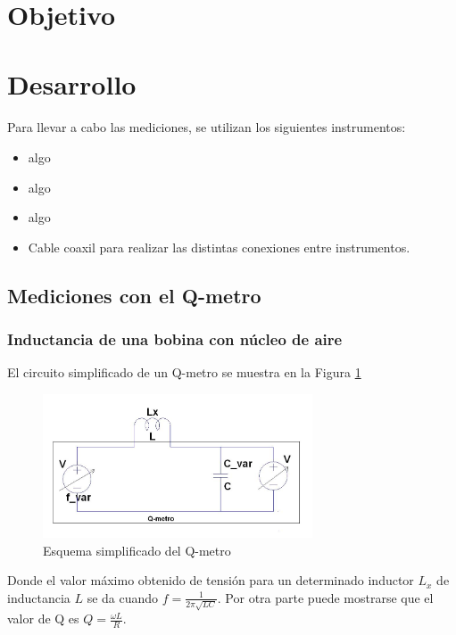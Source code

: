 \documentclass[a4paper,10pt]{article}
\title{  }
\begin{document}
	\maketitle %
	\newpage

	\tableofcontents %
	\newpage


	\section{Objetivo}
	
	\indent	
	\newpage
	\section{Desarrollo}
\indent Para llevar a cabo las mediciones, se utilizan los siguientes
		instrumentos:
		\begin{itemize}
			\item algo
			\item algo
			\item algo
			\item Cable coaxil para realizar las distintas conexiones entre 
			instrumentos.
		\end{itemize}	
	
		\subsection{Mediciones con el Q-metro}
		\subsubsection{Inductancia de una bobina con n\'ucleo de aire}
		El circuito simplificado de un Q-metro se muestra en la Figura \ref{img001}

			\begin{figure}[!htb]
				\centering
				\includegraphics[width=8cm]
				{Imagenes/qmetro.png}
				\caption{Esquema simplificado del Q-metro}
				\label{img001} 
			\end{figure}
		Donde el valor m\'aximo obtenido de tensi\'on para un determinado inductor $L_x$ de inductancia $L$ se da cuando $f=\frac{1}{2\pi\sqrt{LC}}$. Por otra parte puede mostrarse que el valor de Q es $Q=\frac{\omega L}{R}$.
		
\end{document}

